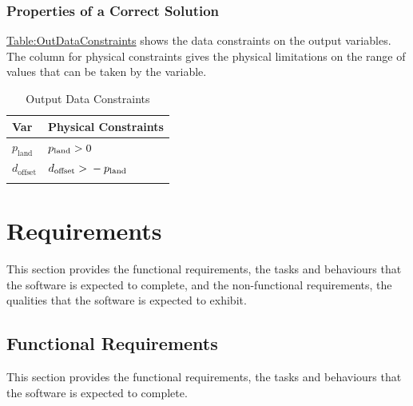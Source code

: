 \documentclass[12pt]{article}
\newcommand{\gt}{\ensuremath >}
\begin{document}
\subsubsection{Properties of a Correct Solution}
\label{Sec:CorSolProps}
\hyperref[Table:OutDataConstraints]{Table:OutDataConstraints} shows the data constraints on the output variables. The column for physical constraints gives the physical limitations on the range of values that can be taken by the variable.

\begin{longtable}{l l}
\toprule
\textbf{Var} & \textbf{Physical Constraints}
\\
\midrule
\endhead
${p_{\text{land}}}$ & ${p_{\text{land}}}\gt{}0$
\\
${d_{\text{offset}}}$ & ${d_{\text{offset}}}\gt{}-{p_{\text{land}}}$
\\
\bottomrule
\caption{Output Data Constraints}
\label{Table:OutDataConstraints}
\end{longtable}
\section{Requirements}
\label{Sec:Requirements}
This section provides the functional requirements, the tasks and behaviours that the software is expected to complete, and the non-functional requirements, the qualities that the software is expected to exhibit.

\subsection{Functional Requirements}
\label{Sec:FRs}
This section provides the functional requirements, the tasks and behaviours that the software is expected to complete.
\end{document}
